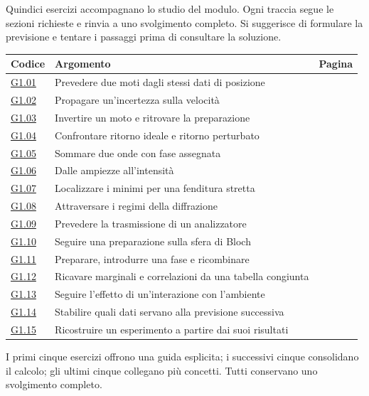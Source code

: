 \clearpage{}\label{exercise-index-1}
Quindici esercizi accompagnano lo studio del modulo. Ogni traccia segue le sezioni richieste e rinvia a uno svolgimento completo. Si suggerisce di formulare la previsione e tentare i passaggi prima di consultare la soluzione.
\begin{longtable}{@{}p{13mm}p{75mm}r@{}}\toprule Codice & Argomento & Pagina\\\midrule\endhead
\hyperref[ex-G1.01]{G1.01} & Prevedere due moti dagli stessi dati di posizione & \pageref{ex-G1.01}\\[3pt]
\hyperref[ex-G1.02]{G1.02} & Propagare un'incertezza sulla velocità & \pageref{ex-G1.02}\\[3pt]
\hyperref[ex-G1.03]{G1.03} & Invertire un moto e ritrovare la preparazione & \pageref{ex-G1.03}\\[3pt]
\hyperref[ex-G1.04]{G1.04} & Confrontare ritorno ideale e ritorno perturbato & \pageref{ex-G1.04}\\[3pt]
\hyperref[ex-G1.05]{G1.05} & Sommare due onde con fase assegnata & \pageref{ex-G1.05}\\[3pt]
\hyperref[ex-G1.06]{G1.06} & Dalle ampiezze all'intensità & \pageref{ex-G1.06}\\[3pt]
\hyperref[ex-G1.07]{G1.07} & Localizzare i minimi per una fenditura stretta & \pageref{ex-G1.07}\\[3pt]
\hyperref[ex-G1.08]{G1.08} & Attraversare i regimi della diffrazione & \pageref{ex-G1.08}\\[3pt]
\hyperref[ex-G1.09]{G1.09} & Prevedere la trasmissione di un analizzatore & \pageref{ex-G1.09}\\[3pt]
\hyperref[ex-G1.10]{G1.10} & Seguire una preparazione sulla sfera di Bloch & \pageref{ex-G1.10}\\[3pt]
\hyperref[ex-G1.11]{G1.11} & Preparare, introdurre una fase e ricombinare & \pageref{ex-G1.11}\\[3pt]
\hyperref[ex-G1.12]{G1.12} & Ricavare marginali e correlazioni da una tabella congiunta & \pageref{ex-G1.12}\\[3pt]
\hyperref[ex-G1.13]{G1.13} & Seguire l'effetto di un'interazione con l'ambiente & \pageref{ex-G1.13}\\[3pt]
\hyperref[ex-G1.14]{G1.14} & Stabilire quali dati servano alla previsione successiva & \pageref{ex-G1.14}\\[3pt]
\hyperref[ex-G1.15]{G1.15} & Ricostruire un esperimento a partire dai suoi risultati & \pageref{ex-G1.15}\\[3pt]
\bottomrule\end{longtable}
{\small I primi cinque esercizi offrono una guida esplicita; i successivi cinque consolidano il calcolo; gli ultimi cinque collegano più concetti. Tutti conservano uno svolgimento completo.}\par
